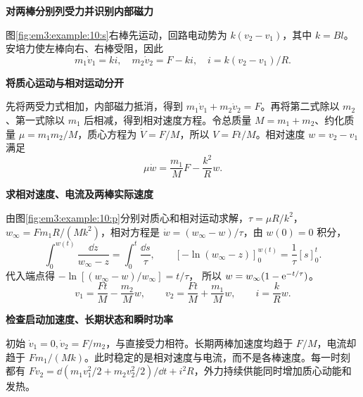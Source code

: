 \begin{solution}\textbf{对两棒分别列受力并识别内部磁力}\par\nobreak
图\ref{fig:em3:example:10:s}右棒先运动，回路电动势为 $k(v_2-v_1)$，其中 $k=Bl$。安培力使左棒向右、右棒受阻，因此
\[m_1\dot v_1=ki,\quad m_2\dot v_2=F-ki,\quad i=k(v_2-v_1)/R.\]


\par\medskip{}\noindent\textbf{将质心运动与相对运动分开}\par\nobreak
先将两受力式相加，内部磁力抵消，得到 $m_1\dot v_1+m_2\dot v_2=F$。再将第二式除以 $m_2$、第一式除以 $m_1$ 后相减，得到相对速度方程。令总质量 $M=m_1+m_2$、约化质量 $\mu=m_1m_2/M$，质心方程为 $\dot V=F/M$，所以 $V=Ft/M$。相对速度 $w=v_2-v_1$ 满足
\[\mu\dot w=\frac{m_1}{M}F-\frac{k^2}{R}w.\]



\par\medskip{}\noindent\textbf{求相对速度、电流及两棒实际速度}\par\nobreak
由图\ref{fig:em3:example:10:p}分别对质心和相对运动求解，$\tau=\mu R/k^2$，$w_\infty=Fm_1R/(Mk^2)$，相对方程是 $\dot w=(w_\infty-w)/\tau$，由 $w(0)=0$ 积分，
\[
\int_0^{w(t)}\frac{\dd z}{w_\infty-z}=\int_0^t\frac{\dd s}{\tau},
 \qquad [-\ln(w_\infty-z)]_0^{w(t)}=\frac1\tau[s]_0^t.
\]
代入端点得 $-\ln[(w_\infty-w)/w_\infty]=t/\tau$，
所以 $w=w_\infty(1-\mathrm e^{-t/\tau})$。
\[v_1=\frac{Ft}{M}-\frac{m_2}{M}w,\qquad v_2=\frac{Ft}{M}+\frac{m_1}{M}w,\qquad i=\frac{k}{R}w.\]


\par\medskip{}\noindent\textbf{检查启动加速度、长期状态和瞬时功率}\par\nobreak
初始 $\dot v_1=0,\dot v_2=F/m_2$，与直接受力相符。长期两棒加速度均趋于 $F/M$，电流却趋于 $Fm_1/(Mk)$。此时稳定的是相对速度与电流，而不是各棒速度。每一时刻都有 $Fv_2=\dd(m_1v_1^2/2+m_2v_2^2/2)/\dd t+i^2R$，外力持续供能同时增加质心动能和发热。\end{solution}
